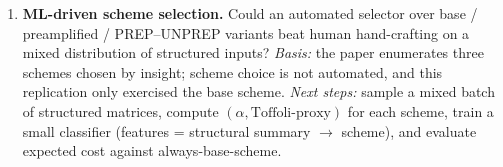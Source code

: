 \begin{enumerate}
  \item \textbf{ML-driven scheme selection.} Could an automated
        selector over base / preamplified / PREP--UNPREP variants
        beat human hand-crafting on a mixed distribution of
        structured inputs?
        \emph{Basis:} the paper enumerates three schemes chosen by
        insight; scheme choice is not automated, and this replication
        only exercised the base scheme.
        \emph{Next steps:} sample a mixed batch of structured
        matrices, compute $(\alpha,\text{Toffoli-proxy})$ for each
        scheme, train a small classifier
        (features = structural summary $\rightarrow$ scheme), and
        evaluate expected cost against always-base-scheme.
\end{enumerate}
